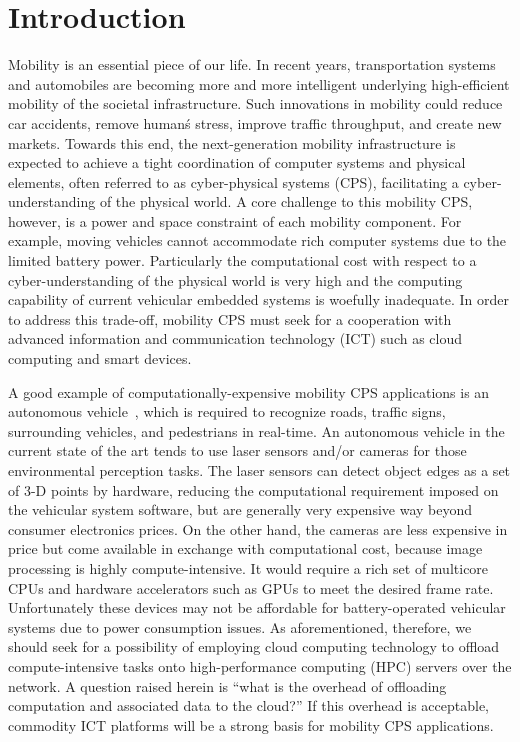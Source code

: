 \section{Introduction}
\label{sec:introduction}

Mobility is an essential piece of our life.
In recent years, transportation systems and automobiles are becoming
more and more intelligent underlying high-efficient mobility of the
societal infrastructure.
Such innovations in mobility could reduce car accidents, remove human\'s
stress, improve traffic throughput, and create new markets.
Towards this end, the next-generation mobility infrastructure is expected to 
achieve a tight coordination of computer systems and physical elements,
often referred to as cyber-physical systems (CPS), facilitating a
cyber-understanding of the physical world.
A core challenge to this mobility CPS, however, is a power and space
constraint of each mobility component.
For example, moving vehicles cannot accommodate rich computer systems
due to the limited battery power.
Particularly the computational cost with respect to a
cyber-understanding of the physical world is very high and the computing
capability of current vehicular embedded systems is woefully
inadequate.
In order to address this trade-off, mobility CPS must seek for a
cooperation with advanced information and communication
technology (ICT) such as cloud computing and smart devices.

A good example of computationally-expensive mobility CPS applications is
an autonomous vehicle~\cite{Guizzo11, Levinson11, Urmson08}, which is
required to recognize roads, traffic signs, surrounding vehicles, and
pedestrians in real-time.
An autonomous vehicle in the current state of the art tends to use laser
sensors and/or cameras for those environmental perception tasks.
The laser sensors can detect object edges as a set of 3-D points by
hardware, reducing the computational requirement imposed on the
vehicular system software, but are generally very expensive way beyond
consumer electronics prices.
On the other hand, the cameras are less expensive in price but come
available in exchange with computational cost, because image processing
is highly compute-intensive.
It would require a rich set of multicore CPUs and hardware accelerators
such as GPUs to meet the desired frame rate.
Unfortunately these devices may not be affordable for battery-operated
vehicular systems due to power consumption issues.
As aforementioned, therefore, we should seek for a possibility of
employing cloud computing technology to offload compute-intensive tasks
onto high-performance computing (HPC) servers over the network.
A question raised herein is ``what is the overhead of offloading
computation and associated data to the cloud?''
If this overhead is acceptable, commodity ICT platforms will be a strong
basis for mobility CPS applications.

